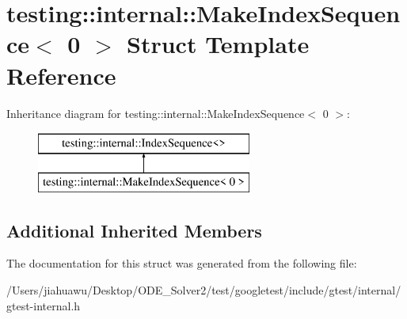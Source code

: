 \hypertarget{structtesting_1_1internal_1_1_make_index_sequence_3_010_01_4}{}\section{testing\+:\+:internal\+:\+:Make\+Index\+Sequence$<$ 0 $>$ Struct Template Reference}
\label{structtesting_1_1internal_1_1_make_index_sequence_3_010_01_4}
Inheritance diagram for testing\+:\+:internal\+:\+:Make\+Index\+Sequence$<$ 0 $>$\+:\begin{figure}[H]
\begin{center}
\leavevmode
\includegraphics[height=2.000000cm]{structtesting_1_1internal_1_1_make_index_sequence_3_010_01_4}
\end{center}
\end{figure}
\subsection*{Additional Inherited Members}


The documentation for this struct was generated from the following file\+:\begin{DoxyCompactItemize}
\item 
/\+Users/jiahuawu/\+Desktop/\+O\+D\+E\+\_\+\+Solver2/test/googletest/include/gtest/internal/gtest-\/internal.\+h\end{DoxyCompactItemize}
